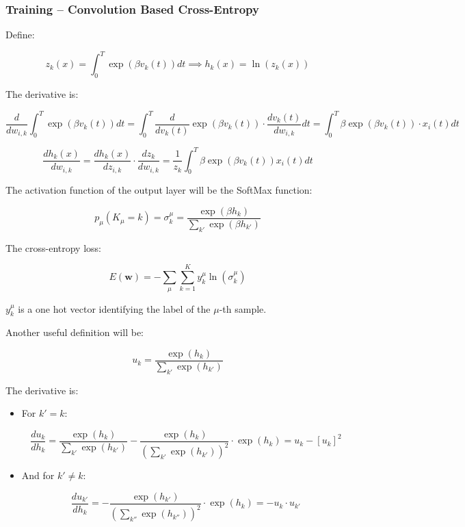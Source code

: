\subsubsection{Training – Convolution Based Cross-Entropy}

Define: 

\begin{equation}
    z_k(x) = \int_0^T \exp(\beta v_k(t)) dt \implies h_k(x) = \ln(z_k(x))
\end{equation}

The derivative is:

\begin{equation}
    \frac{d}{dw_{i,k}} \int_0^T \exp(\beta v_k(t)) dt = \int_0^T \frac{d}{dv_k(t)} \exp(\beta v_k(t)) \cdot \frac{dv_k(t)}{dw_{i,k}} dt = \int_0^T \beta \exp(\beta v_k(t)) \cdot x_i(t) dt
\end{equation}

\begin{equation}
    \frac{dh_k(x)}{dw_{i,k}} = \frac{dh_k(x)}{dz_{i,k}} \cdot \frac{dz_k}{dw_{i,k}} = \frac{1}{z_k} \int_0^T \beta \exp(\beta v_k(t)) x_i(t) dt
\end{equation}

The activation function of the output layer will be the SoftMax function:

\begin{equation}
    p_{\mu}(K_{\mu}=k) = \sigma_k^{\mu} = \frac{\exp(\beta h_k)}{\sum_{k'} \exp(\beta h_{k'})}
\end{equation}

The cross-entropy loss:

\begin{equation}
    E(\mathbf{w}) = -\sum_{\mu} \sum_{k=1}^K y_k^{\mu} \ln(\sigma_k^{\mu})
\end{equation}

\(y_k^{\mu}\) is a one hot vector identifying the label of the \(\mu\)-th sample.

Another useful definition will be:

\begin{equation}
    u_k = \frac{\exp(h_k)}{\sum_{k'} \exp(h_{k'})}
\end{equation}

The derivative is: \\
\begin{itemize}
    \item For \(k'=k\):

\begin{equation}
    \frac{du_k}{dh_k} = \frac{\exp(h_k)}{\sum_{k'} \exp(h_{k'})} - \frac{\exp(h_k)}{\left(\sum_{k'} \exp(h_{k'})\right)^2} \cdot \exp(h_k) = u_k - [u_k]^2
\end{equation}

\item And for \(k' \neq k\):

\begin{equation}
    \frac{du_{k'}}{dh_k} = -\frac{\exp(h_{k'})}{\left(\sum_{k''} \exp(h_{k''})\right)^2} \cdot \exp(h_k) = -u_k \cdot u_{k'}
\end{equation}
\end{itemize}

